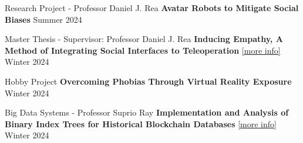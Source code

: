 
\begin{cventries}

    \cventry
    {Research Project - Professor Daniel J. Rea}
    {\textbf {Avatar Robots to Mitigate Social Biases}}
    {}
    {Summer 2024}
    {}
    \vspace{0.0 cm}

  \end{cventries}
  \begin{cventries}
  
    \cventry
    {Master Thesis - Supervisor: Professor Daniel J. Rea}
    {\textbf {Inducing Empathy, A Method of Integrating Social Interfaces to Teleoperation}
    \href{https://github.com/ph504/Teleoperation-Interface}{\textcolor{cobalt}{[more info]}}}
    {}
    {Winter 2024}
    {}
    \vspace{0.0 cm}
  \end{cventries}
  \begin{cventries}
    \cventry
    {Hobby Project}
    {\textbf {Overcoming Phobias Through Virtual Reality Exposure}}
    {}
    {Winter 2024}
    {}
    \vspace{0.0 cm}

  \end{cventries}
  \begin{cventries}
    \cventry
    {Big Data Systems - Professor Suprio Ray}
    {\textbf {Implementation and Analysis of Binary Index Trees for Historical Blockchain Databases}
    \href{https://github.com/ph504/avl-blockchain}{\textcolor{cobalt}{[more info]}}}
    {}
    {Winter 2024}
    {}
    \vspace{0.0 cm}
  
  \end{cventries}
